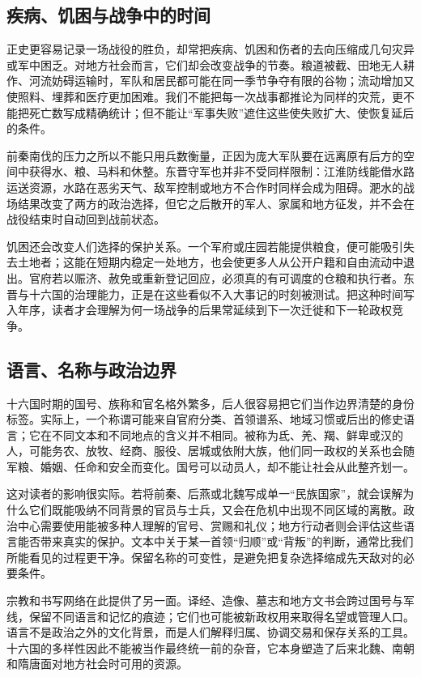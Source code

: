 \subsection{疾病、饥困与战争中的时间}

正史更容易记录一场战役的胜负，却常把疾病、饥困和伤者的去向压缩成几句灾异或军中困乏。对地方社会而言，它们却会改变战争的节奏。粮道被截、田地无人耕作、河流妨碍运输时，军队和居民都可能在同一季节争夺有限的谷物；流动增加又使照料、埋葬和医疗更加困难。我们不能把每一次战事都推论为同样的灾荒，更不能把死亡数写成精确统计；但不能让“军事失败”遮住这些使失败扩大、使恢复延后的条件。

前秦南伐的压力之所以不能只用兵数衡量，正因为庞大军队要在远离原有后方的空间中获得水、粮、马料和休整。东晋守军也并非不受同样限制：江淮防线能借水路运送资源，水路在恶劣天气、敌军控制或地方不合作时同样会成为阻碍。淝水的战场结果改变了两方的政治选择，但它之后散开的军人、家属和地方征发，并不会在战役结束时自动回到战前状态。

饥困还会改变人们选择的保护关系。一个军府或庄园若能提供粮食，便可能吸引失去土地者；这能在短期内稳定一处地方，也会使更多人从公开户籍和自由流动中退出。官府若以赈济、赦免或重新登记回应，必须真的有可调度的仓粮和执行者。东晋与十六国的治理能力，正是在这些看似不入大事记的时刻被测试。把这种时间写入年序，读者才会理解为何一场战争的后果常延续到下一次迁徙和下一轮政权竞争。

\subsection{语言、名称与政治边界}

十六国时期的国号、族称和官名格外繁多，后人很容易把它们当作边界清楚的身份标签。实际上，一个称谓可能来自官府分类、首领谱系、地域习惯或后出的修史语言；它在不同文本和不同地点的含义并不相同。被称为氐、羌、羯、鲜卑或汉的人，可能务农、放牧、经商、服役、居城或依附大族，他们同一政权的关系也会随军粮、婚姻、任命和安全而变化。国号可以动员人，却不能让社会从此整齐划一。

这对读者的影响很实际。若将前秦、后燕或北魏写成单一“民族国家”，就会误解为什么它们既能吸纳不同背景的官员与士兵，又会在危机中出现不同区域的离散。政治中心需要使用能被多种人理解的官号、赏赐和礼仪；地方行动者则会评估这些语言能否带来真实的保护。文本中关于某一首领“归顺”或“背叛”的判断，通常比我们所能看见的过程更干净。保留名称的可变性，是避免把复杂选择缩成先天敌对的必要条件。

宗教和书写网络在此提供了另一面。译经、造像、墓志和地方文书会跨过国号与军线，保留不同语言和记忆的痕迹；它们也可能被新政权用来取得名望或管理人口。语言不是政治之外的文化背景，而是人们解释归属、协调交易和保存关系的工具。十六国的多样性因此不能被当作最终统一前的杂音，它本身塑造了后来北魏、南朝和隋唐面对地方社会时可用的资源。

